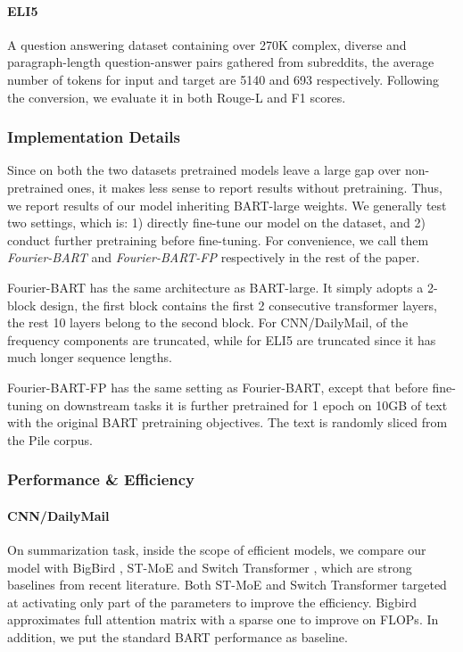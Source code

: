 \documentclass[11pt]{article}
\begin{document}
\paragraph{ELI5} A question answering dataset containing over 270K complex, diverse and paragraph-length question-answer pairs gathered from subreddits, the average number of tokens for input and target are 5140 and 693 respectively. Following the conversion, we evaluate it in both Rouge-L and F1 scores.



\subsubsection{Implementation Details}
\label{sec: enc-dec imp details}
Since on both the two datasets pretrained models leave a large gap over non-pretrained ones, it makes less sense to report results without pretraining. Thus, we report results of our model inheriting BART-large \citep{lewis2019bart} weights. We generally test two settings, which is: 1) directly fine-tune our model on the dataset, and 2) conduct further pretraining before fine-tuning. For convenience, we call them \emph{Fourier-BART} and \emph{Fourier-BART-FP} respectively in the rest of the paper. 

Fourier-BART has the same architecture as BART-large. It simply adopts a 2-block design, the first block contains the first 2 consecutive transformer layers, the rest 10 layers belong to the second block. For CNN/DailyMail,  of the frequency components are truncated, while for ELI5  are truncated since it has much longer sequence lengths. 

Fourier-BART-FP has the same setting as Fourier-BART, except that before fine-tuning on downstream tasks it is further pretrained for 1 epoch on 10GB of text with the original BART pretraining objectives. The text is randomly sliced from the Pile \citep{gao2020pile} corpus.


\subsubsection{Performance \& Efficiency}
\paragraph{CNN/DailyMail} On summarization task, inside the scope of efficient models, we compare our model with BigBird \citep{zaheer2020big}, ST-MoE \citep{zoph2022designing} and Switch Transformer \citep{fedus2021switch}, which are strong baselines from recent literature. Both ST-MoE and Switch Transformer targeted at activating only part of the parameters to improve the efficiency. Bigbird approximates full attention matrix with a sparse one to improve on FLOPs. In addition, we put the standard BART \citep{lewis2019bart} performance as baseline. 
\end{document}
